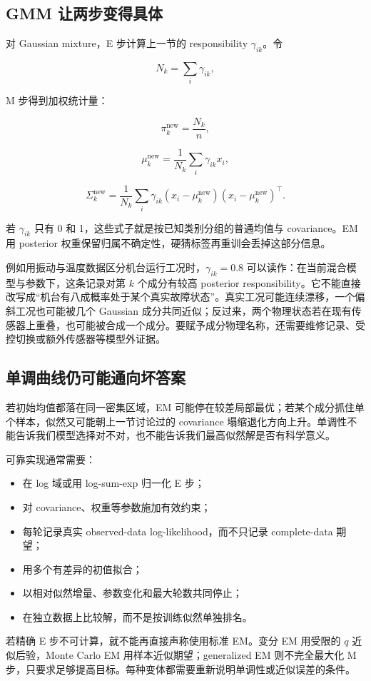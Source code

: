 \subsection{GMM 让两步变得具体}

对 Gaussian mixture，E 步计算上一节的 responsibility \(\gamma_{ik}\)。令

\[
N_k=\sum_i\gamma_{ik},
\]

M 步得到加权统计量：

\[
\pi_k^{\text{new}}=\frac{N_k}{n},
\]

\[
\mu_k^{\text{new}}
=\frac1{N_k}\sum_i\gamma_{ik}x_i,
\]

\[
\Sigma_k^{\text{new}}
=\frac1{N_k}
\sum_i\gamma_{ik}
(x_i-\mu_k^{\text{new}})
(x_i-\mu_k^{\text{new}})^\top.
\]

若 \(\gamma_{ik}\) 只有 0 和 1，这些式子就是按已知类别分组的普通均值与 covariance。EM 用 posterior 权重保留归属不确定性，硬猜标签再重训会丢掉这部分信息。

例如用振动与温度数据区分机台运行工况时，\(\gamma_{ik}=0.8\) 可以读作：在当前混合模型与参数下，这条记录对第 \(k\) 个成分有较高 posterior responsibility。它不能直接改写成``机台有八成概率处于某个真实故障状态''。真实工况可能连续漂移，一个偏斜工况也可能被几个 Gaussian 成分共同近似；反过来，两个物理状态若在现有传感器上重叠，也可能被合成一个成分。要赋予成分物理名称，还需要维修记录、受控切换或额外传感器等模型外证据。

\subsection{单调曲线仍可能通向坏答案}

若初始均值都落在同一密集区域，EM 可能停在较差局部最优；若某个成分抓住单个样本，似然又可能朝上一节讨论过的 covariance 塌缩退化方向上升。单调性不能告诉我们模型选择对不对，也不能告诉我们最高似然解是否有科学意义。

可靠实现通常需要：

\begin{itemize}
\tightlist
\item
  在 log 域或用 log-sum-exp 归一化 E 步；
\item
  对 covariance、权重等参数施加有效约束；
\item
  每轮记录真实 observed-data log-likelihood，而不只记录 complete-data 期望；
\item
  用多个有差异的初值拟合；
\item
  以相对似然增量、参数变化和最大轮数共同停止；
\item
  在独立数据上比较解，而不是按训练似然单独排名。
\end{itemize}

若精确 E 步不可计算，就不能再直接声称使用标准 EM。变分 EM 用受限的 \(q\) 近似后验，Monte Carlo EM 用样本近似期望；generalized EM 则不完全最大化 M 步，只要求足够提高目标。每种变体都需要重新说明单调性或近似误差的条件。
